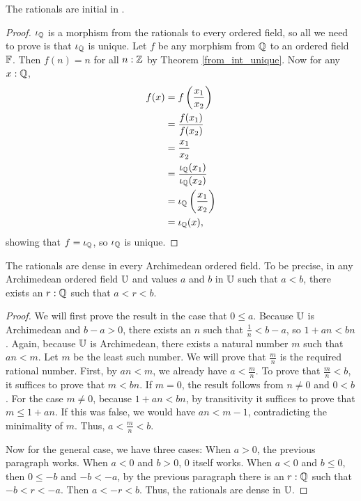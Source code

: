 \documentclass[../../math.tex]{subfiles}
\begin{document}
\begin{theorem} \label{rat_initial}
    The rationals are initial in .
\end{theorem}
\begin{proof}
    $\iota_{\mathbb{Q}}$ is a morphism from the rationals to every ordered field, so all we
    need to prove is that $\iota_{\mathbb{Q}}$ is unique.  Let $f$ be any morphism from $\mathbb{Q}$ to
    an ordered field $\mathbb{F}$.  Then $f(n) = n$ for all $n : \mathbb{Z}$ by Theorem
    \ref{from_int_unique}.  Now for any $x : \mathbb{Q}$,
    \begin{align*}
        f(x)
        &= f \left( \frac{x_1}{x_2} \right) \\
        &= \frac{f(x_1)}{f(x_2)} \\
        &= \frac{x_1}{x_2} \\
        &= \frac{\iota_{\mathbb{Q}}(x_1)}{\iota_{\mathbb{Q}}(x_2)} \\
        &= \iota_{\mathbb{Q}} \left( \frac{x_1}{x_2} \right) \\
        &= \iota_{\mathbb{Q}}(x),
    \end{align*}
    showing that $f = \iota_{\mathbb{Q}}$, so $\iota_{\mathbb{Q}}$ is unique.
\end{proof}

\begin{theorem}
    The rationals are dense in every Archimedean ordered field.  To be precise,
    in any Archimedean ordered field $\mathbb{U}$ and values $a$ and $b$ in $\mathbb{U}$ such
    that $a < b$, there exists an $r : \mathbb{Q}$ such that $a < r < b$.
\end{theorem}
\begin{proof}
    We will first prove the result in the case that $0 \leq a$.  Because $\mathbb{U}$ is
    Archimedean and $b - a > 0$, there exists an $n$ such that $\frac{1}{n} <
    b - a$, so $1 + an < bn$.  Again, because $\mathbb{U}$ is Archimedean, there exists
    a natural number $m$ such that $an < m$.  Let $m$ be the least such number.
    We will prove that $\frac{m}{n}$ is the required rational number.  First, by
    $an < m$, we already have $a < \frac{m}{n}$.  To prove that $\frac{m}{n} <
    b$, it suffices to prove that $m < bn$.  If $m = 0$, the result follows from
    $n \neq 0$ and $0 < b$.  For the case $m \neq 0$, because $1 + an < bn$, by
    transitivity it suffices to prove that $m \leq 1 + an$.  If this was false,
    we would have $an < m - 1$, contradicting the minimality of $m$.  Thus,
    $a < \frac{m}{n} < b$.

    Now for the general case, we have three cases: When $a > 0$, the previous
    paragraph works.  When $a < 0$ and $b > 0$, $0$ itself works.  When $a < 0$
    and $b \leq 0$, then $0 \leq -b$ and $-b < -a$, by the previous paragraph
    there is an $r : \mathbb{Q}$ such that $-b < r < -a$.  Then $a < -r < b$.  Thus, the
    rationals are dense in $\mathbb{U}$.
\end{proof}
\end{document}
